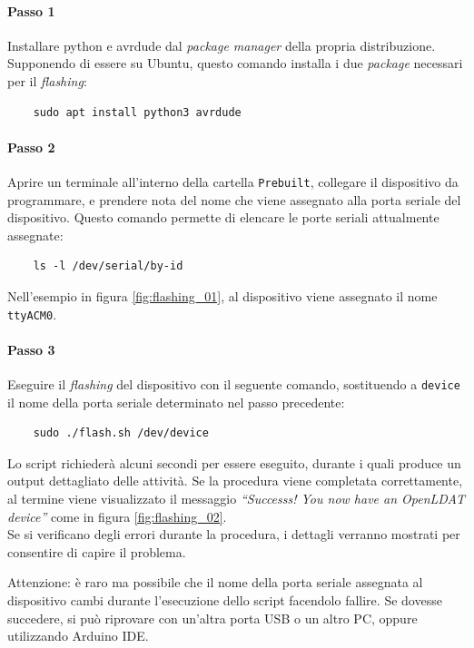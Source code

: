\paragraph{Passo 1} Installare python e avrdude dal \textit{package manager} della propria distribuzione. Supponendo di essere su Ubuntu, questo comando installa i due \textit{package} necessari per il \textit{flashing}:
\begin{verbatim}
	sudo apt install python3 avrdude
\end{verbatim}

\paragraph{Passo 2} Aprire un terminale all'interno della cartella \texttt{Prebuilt}, collegare il dispositivo da programmare, e prendere nota del nome che viene assegnato alla porta seriale del dispositivo. Questo comando permette di elencare le porte seriali attualmente assegnate:
\begin{verbatim}
	ls -l /dev/serial/by-id
\end{verbatim}

Nell'esempio in figura \ref{fig:flashing_01}, al dispositivo viene assegnato il nome \texttt{ttyACM0}.

\paragraph{Passo 3} Eseguire il \textit{flashing} del dispositivo con il seguente comando, sostituendo a \texttt{device} il nome della porta seriale determinato nel passo precedente:
\begin{verbatim}
	sudo ./flash.sh /dev/device
\end{verbatim}

Lo script richiederà alcuni secondi per essere eseguito, durante i quali produce un output dettagliato delle attività. Se la procedura viene completata correttamente, al termine viene visualizzato il messaggio \textit{``Successs! You now have an OpenLDAT device''} come in figura \ref{fig:flashing_02}.\\
Se si verificano degli errori durante la procedura, i dettagli verranno mostrati per consentire di capire il problema.

Attenzione: è raro ma possibile che il nome della porta seriale assegnata al dispositivo cambi durante l'esecuzione dello script facendolo fallire. Se dovesse succedere, si può riprovare con un'altra porta USB o un altro PC, oppure utilizzando Arduino IDE.

